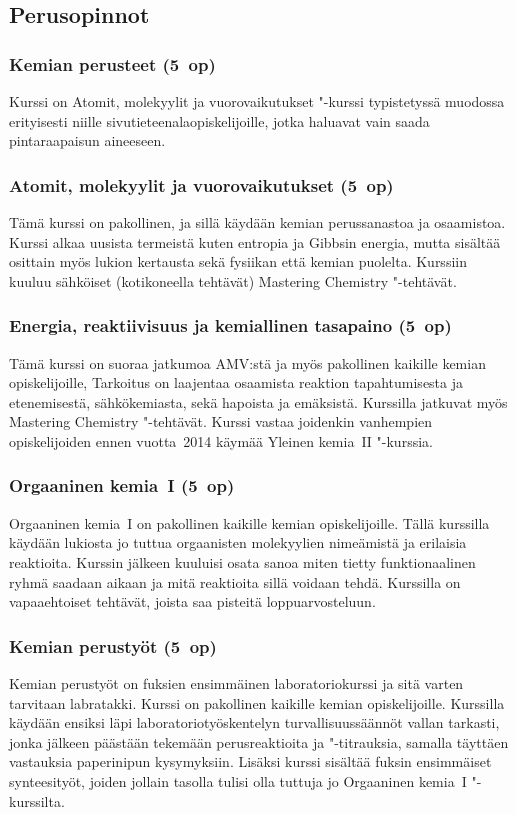 \documentclass[../ala_hataile.tex]{subfiles}
\begin{document}
	\subsection*{Perusopinnot}
	\subsubsection*{Kemian perusteet (5~op)}
	Kurssi on Atomit, molekyylit ja vuorovaikutukset
	"-kurssi typistetyssä muodossa
	erityisesti niille sivu\-tieteen\-ala\-opiskelijoille,
	jotka haluavat vain saada pintaraapaisun
	aineeseen.
	
	\subsubsection*{Atomit, molekyylit ja vuorovaikutukset (5~op)}
	Tämä kurssi on pakollinen, ja sillä käydään
	kemian perussanastoa ja osaamistoa. Kurssi
	alkaa uusista termeistä kuten entropia
	ja Gibbsin energia, mutta sisältää osittain
	myös lukion kertausta sekä fysiikan että
	kemian puolelta. Kurssiin kuuluu
	sähköiset (kotikoneella tehtävät) Mastering
	Chemistry "-tehtävät.
	\subsubsection*{Energia, reaktiivisuus ja kemiallinen tasapaino (5~op)}
	Tämä kurssi on suoraa jatkumoa
	AMV:stä ja myös pakollinen kaikille kemian
	opiskelijoille, Tarkoitus on laajentaa
	osaamista reaktion tapahtumisesta ja etenemisestä,
	sähkökemiasta, sekä hapoista ja
	emäksistä. Kurssilla jatkuvat myös
	Mastering Chemistry "-tehtävät. Kurssi
	vastaa joidenkin vanhempien opiskelijoiden
	ennen vuotta~2014 käymää Yleinen
	kemia~II "-kurssia.
	\subsubsection*{Orgaaninen kemia~I (5~op)}
	Orgaaninen kemia~I on pakollinen kaikille
	kemian opiskelijoille. Tällä kurssilla
	käydään lukiosta jo tuttua orgaanisten molekyylien
	nimeämistä ja erilaisia reaktioita.
	Kurssin jälkeen kuuluisi osata sanoa miten
	tietty funktionaalinen ryhmä saadaan aikaan ja
	mitä reaktioita sillä voidaan tehdä. Kurssilla
	on vapaaehtoiset tehtävät, joista saa pisteitä
	loppuarvosteluun.
	
	\subsubsection*{Kemian perustyöt (5~op)}
	Kemian perustyöt on fuksien ensimmäinen
	laboratorio\-kurssi ja sitä varten tarvitaan labra\-takki.
	Kurssi on pakollinen kaikille kemian opiskelijoille.
	Kurssilla käydään ensiksi läpi laboratorio\-työskentelyn 
	turvallisuus\-säännöt vallan tarkasti, jonka jälkeen
	päästään tekemään perus\-reaktioita
	ja "-titrauksia, samalla täyttäen vastauksia paperi\-nipun
	kysymyksiin. Lisäksi kurssi sisältää fuksin ensimmäiset 
	synteesityöt, joiden jollain tasolla tulisi olla tuttuja jo Orgaaninen kemia~I "-kurssilta.
	
\end{document}
